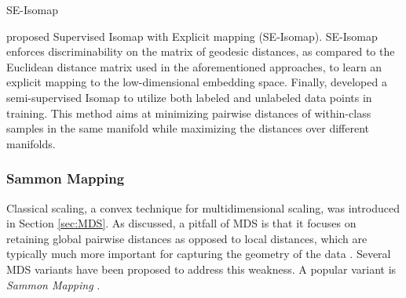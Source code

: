 \begin{algorithm}[h!]
	\caption{SE-Isomap}
	\label{alg:SE_Isomap}
	\begin{algorithmic}[1]
		\Else
		\EndIf
		\EndFor
	\end{algorithmic}
\end{algorithm}

\cite{Li2006SupervisedIsomap} proposed Supervised Isomap with Explicit mapping (SE-Isomap).  SE-Isomap enforces discriminability on the matrix of geodesic distances, as compared to the Euclidean distance matrix used in the aforementioned approaches, to learn an explicit mapping to the low-dimensional embedding space.  Finally, \cite{Zhang2018IsomapMultiManifold} developed a semi-supervised Isomap to utilize both labeled and unlabeled data points in training.  This method aims at minimizing pairwise distances of within-class samples in the same manifold while maximizing the distances over different manifolds.

\subsubsection{Sammon Mapping} \label{sec:sammon_mapping}
Classical scaling, a convex technique for multidimensional scaling, was introduced in Section \ref{sec:MDS}.  As discussed, a pitfall of MDS is that it focuses on retaining global pairwise distances as opposed to local distances, which are typically much more important for capturing the geometry of the data \citep{VanDerMaaten2009DRReview}.  Several MDS variants have been proposed to address this weakness.  A popular variant is \textit{Sammon Mapping} \citep{Sammon1966SammonMapping}.

